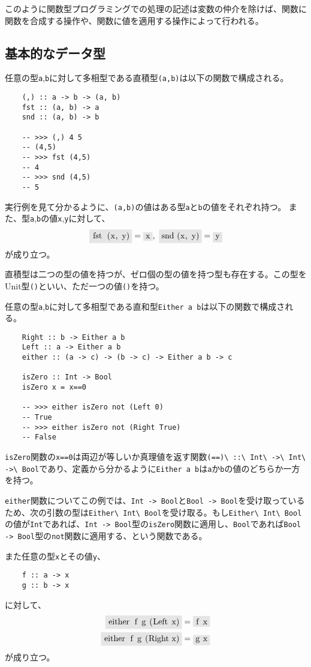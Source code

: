 \documentclass[uplatex,dvipdfmx]{jsarticle}
\newcommand{\pr}[1]{\colorbox[rgb]{0.9,0.9,0.9}{\lstinline{#1}}}
\newcommand{\functype}[2]{\pr{#1 -> #2}}
\begin{document}
  このように関数型プログラミングでの処理の記述は変数の仲介を除けば、関数に関数を合成する操作や、関数に値を適用する操作によって行われる。
  \subsection{基本的なデータ型}
  任意の型\pr{a},\pr{b}に対して多相型である直積型\pr{(a,b)}は以下の関数で構成される。
  \begin{lstlisting}
    (,) :: a -> b -> (a, b)
    fst :: (a, b) -> a
    snd :: (a, b) -> b

    -- >>> (,) 4 5
    -- (4,5)
    -- >>> fst (4,5)
    -- 4
    -- >>> snd (4,5)
    -- 5
  \end{lstlisting}
  実行例を見て分かるように、\pr{(a,b)}の値はある型\pr{a}と\pr{b}の値をそれぞれ持つ。
  また、型\pr{a},\pr{b}の値\pr{x},\pr{y}に対して、\[\pr{fst (x, y)}=\pr{x},\ \pr{snd (x, y)}=\pr{y}\]が成り立つ。

  直積型は二つの型の値を持つが、ゼロ個の型の値を持つ型も存在する。この型をUnit型\pr{()}といい、ただ一つの値\pr{()}を持つ。

  任意の型\pr{a},\pr{b}に対して多相型である直和型\pr{Either a b}は以下の関数で構成される。
  \begin{lstlisting}
    Right :: b -> Either a b
    Left :: a -> Either a b
    either :: (a -> c) -> (b -> c) -> Either a b -> c

    isZero :: Int -> Bool
    isZero x = x==0

    -- >>> either isZero not (Left 0)
    -- True
    -- >>> either isZero not (Right True)
    -- False
  \end{lstlisting}
  \pr{isZero}関数の\pr{x==0}は両辺が等しいか真理値を返す関数\pr{(==)\ ::\ Int\ ->\ Int\ ->\ Bool}であり、定義から分かるように\pr{Either a b}は\pr{a}か\pr{b}の値のどちらか一方を持つ。

  \pr{either}関数についてこの例では、\functype{Int}{Bool}と\functype{Bool}{Bool}を受け取っているため、次の引数の型は\pr{Either\ Int\ Bool}を受け取る。もし\pr{Either\ Int\ Bool}の値が\pr{Int}であれば、\functype{Int}{Bool}型の\pr{isZero}関数に適用し、\pr{Bool}であれば\functype{Bool}{Bool}型の\pr{not}関数に適用する、という関数である。

  また任意の型\pr{x}とその値\pr{y}、
  \begin{lstlisting}
    f :: a -> x
    g :: b -> x
  \end{lstlisting}に対して、
  \begin{align*}
    \pr{either f g (Left x)}&=\pr{f x}\\
    \pr{either f g (Right x)}&=\pr{g x}
  \end{align*}
  が成り立つ。
\end{document}
